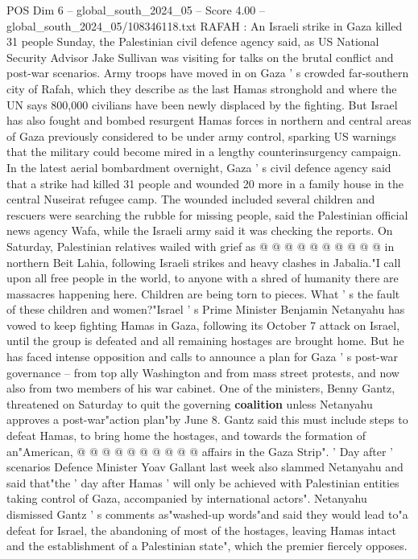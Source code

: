 \begin{textsample}{POS Dim 6 – global\_south\_2024\_05 – Score 4.00 – global\_south\_2024\_05/108346118.txt}  \label{ex:f6_pos_213}
RAFAH : An Israeli strike in Gaza killed 31 people Sunday, the Palestinian civil defence agency said, as US National Security Advisor Jake Sullivan was visiting for talks on the brutal conflict and post-war scenarios.
Army troops have moved in on Gaza ' s crowded far-southern city of Rafah, which they describe as the last Hamas stronghold and where the UN says 800,000 civilians have been newly displaced by the fighting.
But Israel has also fought and bombed resurgent Hamas forces in northern and central areas of Gaza previously considered to be under army control, sparking US warnings that the military could become mired in a lengthy counterinsurgency campaign.
In the latest aerial bombardment overnight, Gaza ' s civil defence agency said that a strike had killed 31 people and wounded 20 more in a family house in the central Nuseirat refugee camp.
The wounded included several children and rescuers were searching the rubble for missing people, said the Palestinian official news agency Wafa, while the Israeli army said it was checking the reports.
On Saturday, Palestinian relatives wailed with grief as @ @ @ @ @ @ @ @ @ @ in northern Beit Lahia, following Israeli strikes and heavy clashes in Jabalia."I call upon all free people in the world, to anyone with a shred of humanity there are massacres happening here.
Children are being torn to pieces.
What ' s the fault of these children and women?"Israel ' s Prime Minister Benjamin Netanyahu has vowed to keep fighting Hamas in Gaza, following its October 7 attack on Israel, until the group is defeated and all remaining hostages are brought home.
But he has faced intense opposition and calls to announce a plan for Gaza ' s post-war governance -- from top ally Washington and from mass street protests, and now also from two members of his war cabinet.
One of the ministers, Benny Gantz, threatened on Saturday to quit the governing \textbf{coalition} unless Netanyahu approves a post-war"action plan"by June 8.
Gantz said this must include steps to defeat Hamas, to bring home the hostages, and towards the formation of an"American, @ @ @ @ @ @ @ @ @ @ affairs in the Gaza Strip". ' Day after ' scenarios Defence Minister Yoav Gallant last week also slammed Netanyahu and said that"the ' day after Hamas ' will only be achieved with Palestinian entities taking control of Gaza, accompanied by international actors".
Netanyahu dismissed Gantz ' s comments as"washed-up words"and said they would lead to"a defeat for Israel, the abandoning of most of the hostages, leaving Hamas intact and the establishment of a Palestinian state", which the premier fiercely opposes.

\end{textsample}
